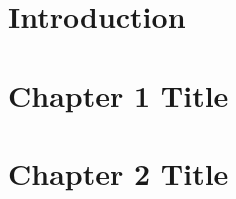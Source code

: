 %
%
%
%




\cleardoublepage
\chapter*{Introduction} %




\chapter{Chapter 1 Title}
\label{ch:1}






\chapter{Chapter 2 Title}
\label{ch:2}

\lipsum[13-20]


\backmatter




\printindex %


